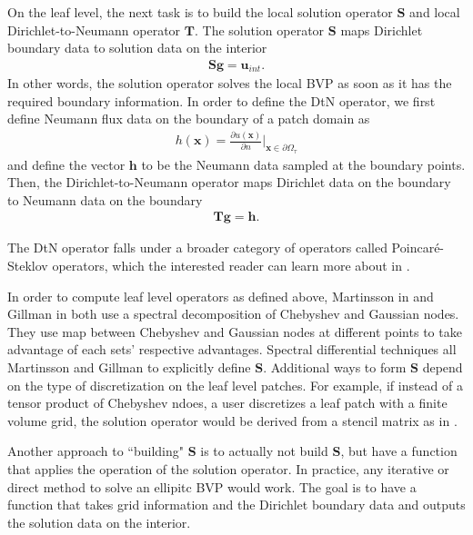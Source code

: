 On the leaf level, the next task is to build the local solution operator $\textbf{S}$ and local Dirichlet-to-Neumann operator $\textbf{T}$. The solution operator $\textbf{S}$ maps Dirichlet boundary data to solution data on the interior
\begin{align}
    \textbf{S} \textbf{g} = \textbf{u}_{int}.
\end{align}
In other words, the solution operator solves the local BVP as soon as it has the required boundary information. In order to define the DtN operator, we first define Neumann flux data on the boundary of a patch domain as
\begin{align}
h(\textbf{x}) = \frac{\partial u(\textbf{x})}{\partial n} \Big|_{\textbf{x} \in \partial \Omega_{\tau}}
\end{align}
and define the vector $\textbf{h}$ to be the Neumann data sampled at the boundary points. Then, the Dirichlet-to-Neumann operator maps Dirichlet data on the boundary to Neumann data on the boundary
\begin{align}
    \textbf{T} \textbf{g} = \textbf{h}.
\end{align}

The DtN operator falls under a broader category of operators called Poincaré-Steklov operators, which the interested reader can learn more about in \citep{quarteroni1991theory}.

In order to compute leaf level operators as defined above, Martinsson in \citep{martinsson2015hierarchical} and Gillman in \citep{gillman2014direct} both use a spectral decomposition of Chebyshev and Gaussian nodes. They use map between Chebyshev and Gaussian nodes at different points to take advantage of each sets' respective advantages. Spectral differential techniques all Martinsson and Gillman to explicitly define $\textbf{S}$. Additional ways to form $\textbf{S}$ depend on the type of discretization on the leaf level patches. For example, if instead of a tensor product of Chebyshev ndoes, a user discretizes a leaf patch with a finite volume grid, the solution operator would be derived from a stencil matrix as in \citep{leveque2007finite}.

Another approach to ``building" $\textbf{S}$ is to actually not build $\textbf{S}$, but have a function that applies the operation of the solution operator. In practice, any iterative or direct method to solve an ellipitc BVP would work. The goal is to have a function that takes grid information and the Dirichlet boundary data and outputs the solution data on the interior.

